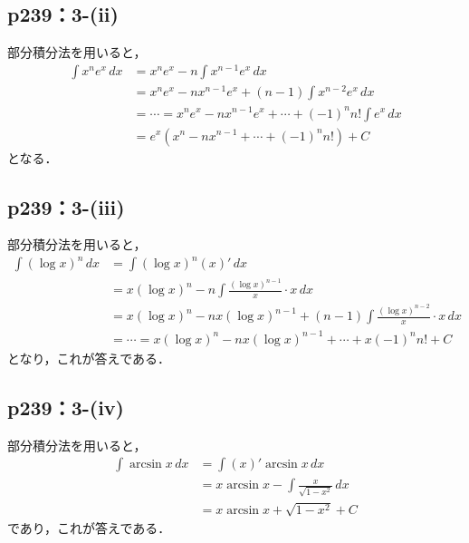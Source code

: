 \documentclass[uplatex,dvipdfmx,a4paper,10pt,fleqn]{jsarticle}
\begin{document}
\subsection*{p239：3-(ii)}

\begin{tleftbar}
    部分積分法を用いると，
    \begin{align*}
        \int x^n e^x \, dx & = x^n e^x - n \int x^{n-1} e^x \, dx \\
        & = x^n e^x - n x^{n-1} e^x + (n-1)\int x^{n-2} e^x \, dx \\
        & = \cdots = x^n e^x - n x^{n-1} e^x + \cdots + (-1)^n n! \int e^x \, dx \\
        & = e^x (x^n -n x^{n-1}+ \cdots +(-1)^n n!) + C
    \end{align*}
    となる．
\end{tleftbar}

\subsection*{p239：3-(iii)}

\begin{tleftbar}
    部分積分法を用いると，
    \begin{align*}
        \int (\log x)^n \, dx & = \int (\log x)^n  (x)' \, dx \\
        & = x (\log x)^n - n \int  \frac{(\log x)^{n-1}}{x} \cdot  x \, dx \\
        & =  x (\log x)^n - n x(\log x)^{n-1} + (n-1) \int \frac{(\log x)^{n-2}}{x} \cdot x \, dx \\
        & = \cdots = x (\log x)^n - n x(\log x)^{n-1} + \cdots + x(-1)^n n!+C
    \end{align*}
    となり，これが答えである．
\end{tleftbar}

\subsection*{p239：3-(iv)}
\begin{leftbar}
    部分積分法を用いると，
    \begin{align*}
        \int \arcsin x \, dx & = \int (x)' \arcsin x \, dx \\
        & = x \arcsin x  - \int \frac{x}{\sqrt{1-x^2}} \, dx \\
        & = x \arcsin x + \sqrt{1-x^2} + C
    \end{align*}
    であり，これが答えである．
\end{leftbar}
\end{document}
